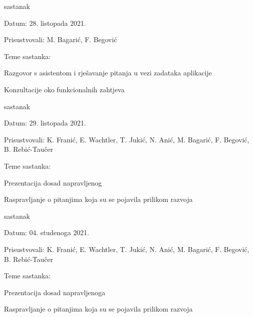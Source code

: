 \begin{packed_enum}
			\item  sastanak
			\item[] \begin{packed_item}
				\item Datum: 28. listopada 2021.
				\item Prisustvovali: M. Bagarić, F. Begović
				\item Teme sastanka:
				\begin{packed_item}
					\item  Razgovor s asistentom i rješavanje pitanja u vezi zadataka aplikacije
					\item  Konzultacije oko funkcionalnih zahtjeva
				\end{packed_item}
			\end{packed_item}
		
			\item  sastanak
			\item[] \begin{packed_item}
				\item Datum: 29. listopada 2021.
				\item Prisustvovali: K. Franić, E. Wachtler, T. Jukić, N. Anić, M. Bagarić, F. Begović, B. Rebić-Taučer
				\item Teme sastanka:
				\begin{packed_item}
					\item  Prezentacija dosad napravljenog
					\item  Raspravljanje o pitanjima koja su se pojavila prilikom razvoja
				\end{packed_item}
			\end{packed_item}
		
			\item  sastanak
			\item[] \begin{packed_item}
				\item Datum: 04. studenoga 2021.
				\item Prisustvovali: K. Franić, E. Wachtler, T. Jukić, N. Anić, M. Bagarić, F. Begović, B. Rebić-Taučer
				\item Teme sastanka:
				\begin{packed_item}
					\item  Prezentacija dosad napravljenoga
					\item  Raspravljanje o pitanjima koja su se pojavila prilikom razvoja
				\end{packed_item}
			\end{packed_item}
		

\end{packed_enum}
